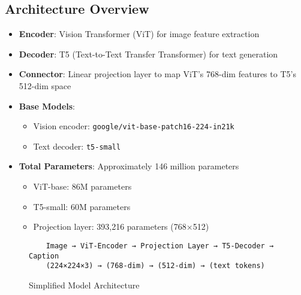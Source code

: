 \documentclass[12pt,a4paper]{report}
\begin{document}
\subsection{Architecture Overview}
\begin{itemize}
    \item \textbf{Encoder}: Vision Transformer (ViT) for image feature extraction
    \item \textbf{Decoder}: T5 (Text-to-Text Transfer Transformer) for text generation
    \item \textbf{Connector}: Linear projection layer to map ViT's 768-dim features to T5's 512-dim space
    \item \textbf{Base Models}: 
        \begin{itemize}
            \item Vision encoder: \texttt{google/vit-base-patch16-224-in21k}
            \item Text decoder: \texttt{t5-small}
        \end{itemize}
    \item \textbf{Total Parameters}: Approximately 146 million parameters
        \begin{itemize}
            \item ViT-base: 86M parameters
            \item T5-small: 60M parameters 
            \item Projection layer: 393,216 parameters (768×512)
        \end{itemize}
\end{itemize}

\begin{figure}[H]
    \centering
    \begin{verbatim}
    Image → ViT-Encoder → Projection Layer → T5-Decoder → Caption
    (224×224×3) → (768-dim) → (512-dim) → (text tokens)
    \end{verbatim}
    \caption{Simplified Model Architecture}
    \label{fig:architecture}
\end{figure}
\end{document}
